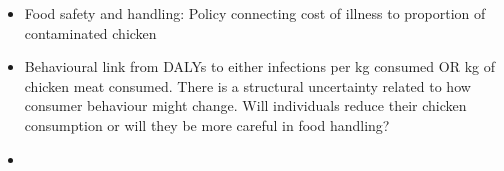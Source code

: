 \begin{itemize}
    \item Food safety and handling: Policy connecting cost of illness to proportion of contaminated chicken
    \item Behavioural link from DALYs to either infections per kg consumed OR kg of chicken meat consumed. There is a structural uncertainty related to how consumer behaviour might change. Will individuals reduce their chicken consumption or will they be more careful in food handling?
    \item 
\end{itemize}